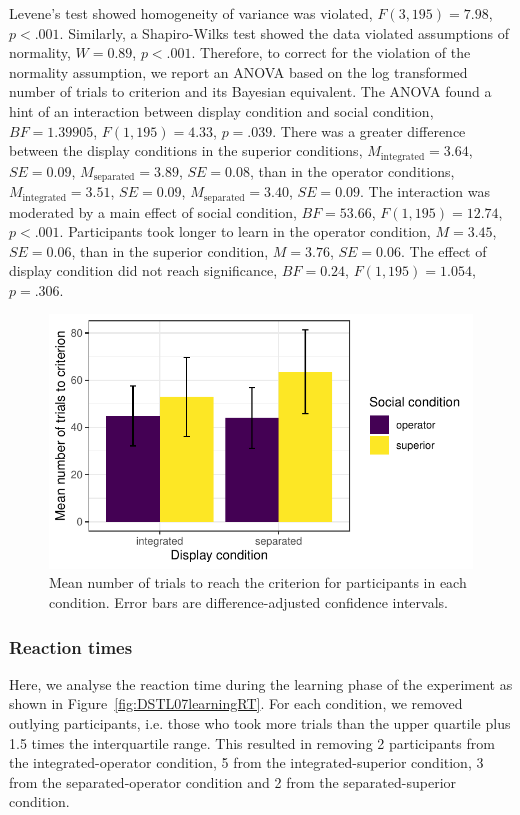 \documentclass[doc, a4paper, apacite]{apa6}
\begin{document}
Levene's test showed homogeneity of variance was violated, $F(3,195)=7.98$, $p<.001$.
Similarly, a Shapiro-Wilks test showed the data violated assumptions of normality, $W=0.89$, $p<.001$. 
Therefore, to correct for the violation of the normality assumption, we report an ANOVA based on the log transformed number of trials to criterion and its Bayesian equivalent. 
The ANOVA found a hint of an interaction between display condition and social condition, $BF=1.39905$, $F(1, 195)=4.33$, $p=.039$. 
There was a greater difference between the display conditions in the superior conditions, $M_\text{integrated}=3.64$, $SE=0.09$, $M_\text{separated}=3.89$, $SE=0.08$, than in the operator conditions, $M_\text{integrated}=3.51$, $SE=0.09$, $M_\text{separated}=3.40$, $SE=0.09$. 
The interaction was moderated by a main effect of social condition, $BF=53.66$, $F(1, 195)=12.74$, $p<.001$. 
Participants took longer to learn in the operator condition, $M=3.45$, $SE=0.06$, than in the superior condition, $M=3.76$, $SE=0.06$. 
The effect of display condition did not reach significance, $BF=0.24$, $F(1, 195)=1.054$, $p=.306$. 

\begin{figure}
	\centering
	\includegraphics{images/DSTL07trialsCriterion}
	\caption{Mean number of trials to reach the criterion for participants in each condition. Error bars are difference-adjusted confidence intervals.}
	\label{fig:DSTL07trialsCriterion}
\end{figure}

\subsubsection{Reaction times}
Here, we analyse the reaction time during the learning phase of the experiment as shown in Figure~\ref{fig:DSTL07learningRT}. 
For each condition, we removed outlying participants, i.e. those who took more trials than the upper quartile plus 1.5 times the interquartile range. 
This resulted in removing 2 participants from the integrated-operator condition, 5 from the integrated-superior condition, 3 from the separated-operator condition and 2 from the separated-superior condition. 
\end{document}
